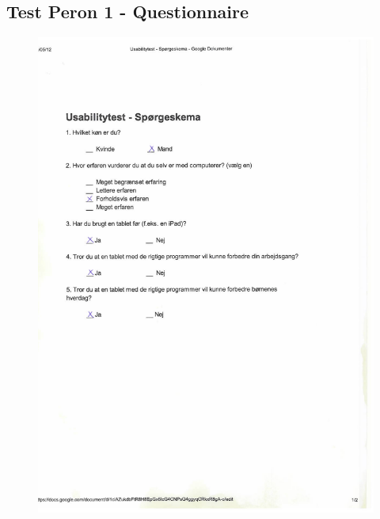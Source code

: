 \subsection*{Test Peron 1 - Questionnaire}
\begin{figure}[H]
	\centering
		\includegraphics[width=\textwidth]{Appendix/demo_d1.pdf}
	\label{fig:demo_t1}
\end{figure}

